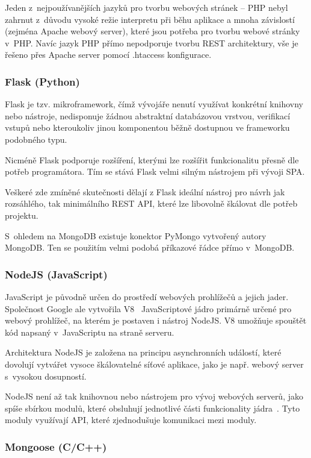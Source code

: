 Jeden z~nejpoužívanějších jazyků pro tvorbu webových stránek -- PHP nebyl zahrnut z~důvodu vysoké režie interpretu při běhu aplikace a mnoha závislostí (zejména Apache webový server), které jsou potřeba pro tvorbu webové stránky v~PHP. Navíc jazyk PHP přímo nepodporuje tvorbu REST architektury, vše je řešeno přes Apache server pomocí .htaccess konfigurace.

\subsubsection*{Flask (Python)}

Flask je tzv. mikroframework, čímž vývojáře nenutí využívat konkrétní knihovny nebo nástroje, nedisponuje žádnou abstraktní databázovou vrstvou, verifikací vstupů nebo kteroukoliv jinou komponentou běžně dostupnou ve frameworku podobného typu.

Nicméně Flask podporuje rozšíření, kterými lze rozšířit funkcionalitu přesně dle potřeb programátora. Tím se stává Flask velmi silným nástrojem při vývoji SPA.

Veškeré zde zmíněné skutečnosti dělají z Flask ideální nástroj pro návrh jak rozsáhlého, tak minimálního REST API, které lze libovolně škálovat dle potřeb projektu.

S~ohledem na MongoDB existuje konektor PyMongo vytvořený autory MongoDB. Ten se použitím velmi podobá příkazové řádce přímo v~MongoDB. 

\subsubsection*{NodeJS (JavaScript)}

JavaScript je původně určen do prostředí webových prohlížečů a jejich jader. Společnost Google ale vytvořila V8~\cite{google:v8} JavaScriptové jádro primárně určené pro webový prohlížeč, na kterém je postaven i nástroj NodeJS. V8 umožňuje spouštět kód napsaný v~JavaScriptu na straně serveru.

Architektura NodeJS je založena na principu asynchronních událostí, které dovolují vytvářet vysoce škálovatelné síťové aplikace, jako je např. webový server s~vysokou dosupností.

NodeJS není až tak knihovnou nebo nástrojem pro vývoj webových serverů, jako spíše sbírkou modulů, které obsluhují jednotlivé části funkcionality jádra~\cite{nodejs}. Tyto moduly využívají API, které zjednodušuje komunikaci mezi moduly.

\subsubsection*{Mongoose (C/C++)}

